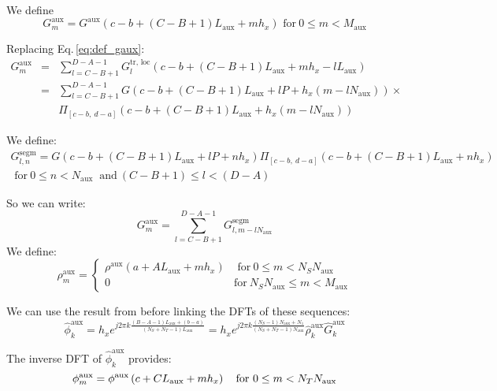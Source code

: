 We define
\begin{equation}
G^\text{aux}_m = G^\text{aux}\left(c-b +(C-B+1)L_\text{aux} + mh_x\right) 
\text{ for}~0 \leq m <M_\text{aux}
\end{equation}

Replacing Eq.\,\ref{eq:def_gaux}: 
\begin{eqnarray}
G^\text{aux}_m 
&=&
\sum_{l=C-B+1}^{D-A-1}
G^\text{tr, loc}_{l}(c-b +(C-B+1)L_\text{aux} + mh_x -l L_\text{aux})\\
&=&
\sum_{l=C-B+1}^{D-A-1}
G(c-b  +(C-B+1)L_\text{aux} +lP + h_x (m  -l N_\text{aux}) ) \times\\
&&
\Pi_{[c-b,~d-a]}(c-b +(C-B+1)L_\text{aux} + h_x(m -l N_\text{aux}))
\end{eqnarray}

We define:
\begin{multline}
G^\text{segm}_{l,n} =  G(c-b  +(C-B+1)L_\text{aux} +lP + n h_x ) 
\Pi_{[c-b,~d-a]}(c-b +(C-B+1)L_\text{aux} + n h_x)\\
\text{ for}~0 \leq n <N_\text{aux}
~\text{ and}~(C-B+1) \leq l < (D-A)
\end{multline}

So we can write:
\begin{equation}
G^\text{aux}_m = \sum_{l=C-B+1}^{D-A-1}
G^\text{segm}_{l,m-lN_\text{aux}}
\end{equation}
We define:
\begin{equation}
\rho^\text{aux}_m = 
 \begin{cases}
\rho^\text{aux}\left(a +AL_\text{aux} + mh_x\right) 
&\text{ for}~0 \leq m <N_S N_\text{aux}\\
 0 & \text{for}~N_S N_\text{aux} \leq m < M_\text{aux}
\end{cases}
\end{equation}

We can use the result from before linking the DFTs of these sequences:
\begin{equation}
\hat{\phi}^\text{aux}_k  = 
h_x 
e^{j2\pi k \frac{(B-A-1)L_\text{aux} + (b-a)}{(N_S + N_T-1)L_\text{aux}}}
=
h_x 
e^{j2\pi k \frac{(N_S-1)N_\text{aux} + N_1}{(N_S + N_T -1)N_\text{aux}}}
\hat{\rho}^\text{aux}_k \hat{G}^\text{aux}_k
\end{equation}

The inverse DFT of $\hat{\phi}^\text{aux}_k$ provides:
\begin{equation}
\phi^\text{aux}_m = 
\phi^\text{aux}\left(c +CL_\text{aux} + mh_x\right) 
\text{~~ for}~0 \leq m <N_T N_\text{aux}\\
\end{equation}

